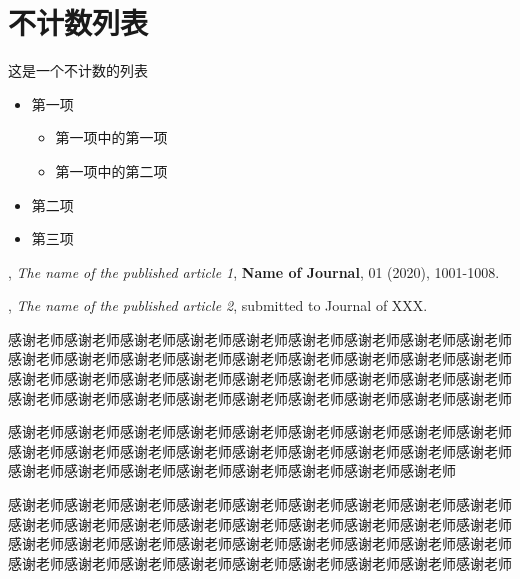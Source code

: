 \documentclass{shnuthesis}
\begin{document}
\section{不计数列表}

这是一个不计数的列表
\begin{itemize}
	\item 第一项
	\begin{itemize}
		\item 第一项中的第一项
		\item 第一项中的第二项
	\end{itemize}
	\item 第二项
	\item 第三项
\end{itemize}



\nocite{*}  %




\begin{researchpage}


,  {\em The name of the published article 1}, {\bf Name of Journal}, 01 (2020), 1001-1008.


,  {\em The name of the published article 2}, submitted to
Journal of XXX.


\end{researchpage}




\begin{thankpage}
\setlength{\baselineskip}{24pt}

感谢老师感谢老师感谢老师感谢老师感谢老师感谢老师感谢老师感谢老师感谢老师感谢老师感谢老师感谢老师感谢老师感谢老师感谢老师感谢老师感谢老师感谢老师感谢老师感谢老师感谢老师感谢老师感谢老师感谢老师感谢老师感谢老师感谢老师感谢老师感谢老师感谢老师感谢老师感谢老师感谢老师感谢老师感谢老师感谢老师
		
感谢老师感谢老师感谢老师感谢老师感谢老师感谢老师感谢老师感谢老师感谢老师感谢老师感谢老师感谢老师感谢老师感谢老师感谢老师感谢老师感谢老师感谢老师感谢老师感谢老师感谢老师感谢老师感谢老师感谢老师感谢老师感谢老师

感谢老师感谢老师感谢老师感谢老师感谢老师感谢老师感谢老师感谢老师感谢老师感谢老师感谢老师感谢老师感谢老师感谢老师感谢老师感谢老师感谢老师感谢老师感谢老师感谢老师感谢老师感谢老师感谢老师感谢老师感谢老师感谢老师感谢老师感谢老师感谢老师感谢老师感谢老师感谢老师感谢老师感谢老师感谢老师感谢老师

\end{thankpage}
\end{document}
